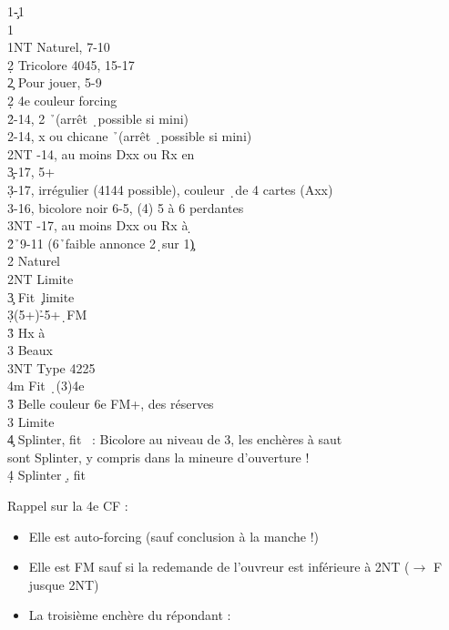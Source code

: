 \documentclass[a4paper]{article}
\begin{document}
\begin{bidtable}
1\c-1\d\\
1\s\+\\
1NT \> Naturel, 7-10\+\\
2\d \> Tricolore 4045, 15-17\-\\
2\c \> Pour jouer, 5-9\\
2\d \> 4e couleur forcing\+\\
2\h {}-14, 2 \h\ (arrêt \d\ possible si mini)\\
2\s {}-14, x ou chicane \h\ (arrêt \d\ possible si mini)\\
2NT -14, au moins Dxx ou Rx en \d \\
3\c {}-17, 5+\c \\
3\d {}-17, irrégulier (4144 possible), couleur \d\ de 4 cartes (Axx)\\
3\s {}-16, bicolore noir 6-5, (4) 5 à 6 perdantes\\
3NT -17, au moins Dxx ou Rx à \d \-\\
2\h {}\h\ 9-11 (6\h\ faible annonce 2\d\ sur 1\c )\\
2\s \> Naturel\\
2NT \> Limite\\
3\c \> Fit \c\ limite\\
3\d {}(5+)\h -5+\d\ FM\+\\
3\h \> Hx à \h \\
3\s \> Beaux \s \\
3NT \> Type 4225\\
4m \> Fit \d\ (3)4e\-\\
3\h \> Belle couleur 6e FM+, des réserves\\
3\s \> Limite\\
4\c \> Splinter, fit \s\ : Bicolore au niveau de 3, les enchères à saut\\
\>sont Splinter, y compris dans la mineure d'ouverture !\\
4\d \> Splinter \d , fit \s \-
\end{bidtable}

Rappel sur la 4e CF :

\begin{itemize}
\item Elle est auto-forcing (sauf conclusion à la manche !)

\item Elle est FM sauf si la redemande de l'ouvreur est inférieure à 2NT ($\rightarrow$ F jusque 2NT)

\item La troisième enchère du répondant :

\end{itemize}
\end{document}
